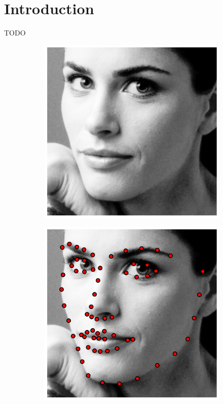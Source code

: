 
\chapter{Introduction}
TODO
\begin{figure}[h]
    \centering
    \begin{subfigure}[b]{0.145\textwidth}
            \includegraphics[width=\textwidth]{resources/Annotation_Correction/Fig_Intro/intro_0_0}
    \end{subfigure}
    \hfill
    \begin{subfigure}[b]{0.145\textwidth}
            \includegraphics[width=\textwidth]{resources/Annotation_Correction/Fig_Intro/intro_0_1}

\end{subfigure}
\end{figure}
